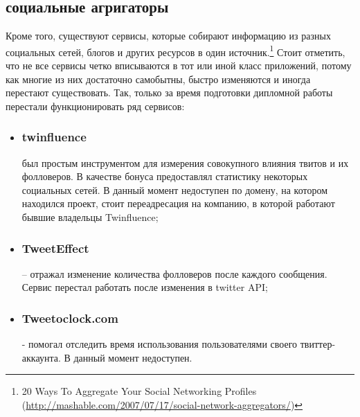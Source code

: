 \begin{itemize}
\subsection{социальные агригаторы}
Кроме того, существуют сервисы, которые собирают информацию из разных социальных сетей, блогов и других ресурсов в один источник.\footnote{20 Ways To Aggregate Your Social Networking Profiles (\url{http://mashable.com/2007/07/17/social-network-aggregators/})} 
Стоит отметить, что не все сервисы четко вписываются в тот или иной класс приложений, потому как многие из них достаточно самобытны, быстро изменяются и иногда перестают существовать. Так, только за время подготовки дипломной работы перестали функционировать ряд сервисов:
\begin{itemize}
\item \subsubsection{twinfluence} был простым инструментом для измерения совокупного влияния твитов и их фолловеров. В качестве бонуса предоставлял статистику некоторых социальных сетей. В данный момент недоступен по домену, на котором находился проект, стоит переадресация на компанию, в которой работают бывшие владельцы Twinfluence;
\item \subsubsection{TweetEffect} – отражал изменение количества фолловеров после каждого сообщения. Сервис перестал работать после изменения в twitter API;
\item \subsubsection {Tweetoclock.com} - помогал отследить время использования пользователями своего твиттер-аккаунта. В данный момент недоступен.
\end{itemize}


\end{itemize}
